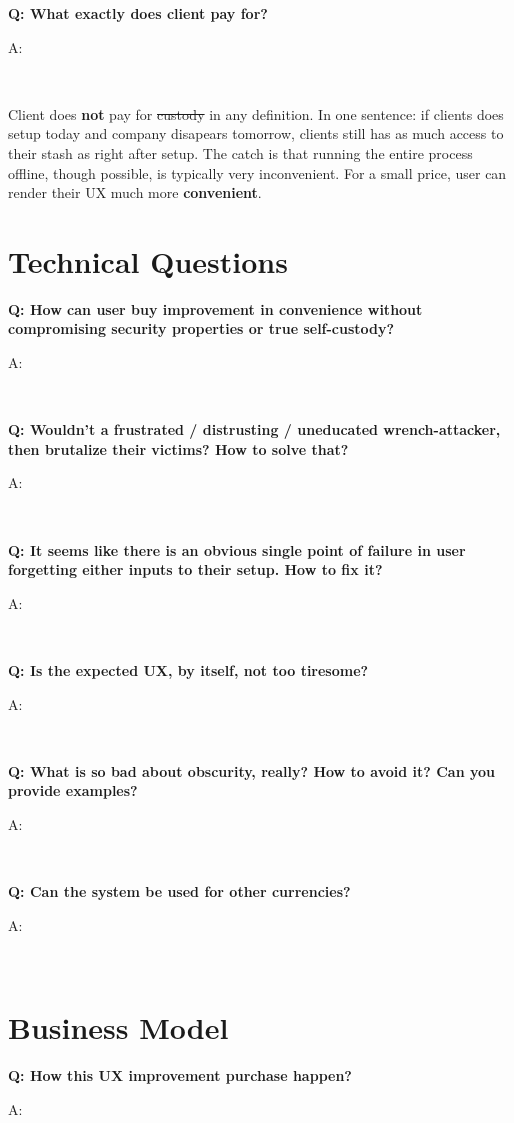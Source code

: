 \documentclass[12pt,a4paper]{article}
\newenvironment{question}[1]{%
  \vspace{0.8em}\noindent\textbf{Q: #1}\par
  \vspace{0.2em}\noindent\begin{itshape}A:\end{itshape}~%
}{\vspace{0.8em}}
\begin{document}
\begin{question}{What exactly does client pay for?}
Client does \textbf{not} pay for \sout{custody} in any definition. In one sentence: if clients does setup today and company disapears tomorrow, clients still has as much access to their stash as right after setup. The catch is that running the entire process offline, though possible, is typically very inconvenient. For a small price, user can render their UX much more \textbf{convenient}.
\end{question}

\section{Technical Questions}

\begin{question}{How can user buy improvement in convenience without compromising security properties or true self-custody?}
\end{question}

\begin{question}{Wouldn't a frustrated / distrusting / uneducated wrench-attacker, then brutalize their victims? How to solve that?}
\end{question}

\begin{question}{It seems like there is an obvious single point of failure in user forgetting either inputs to their setup. How to fix it?}
\end{question}

\begin{question}{Is the expected UX, by itself, not too tiresome?}
\end{question}

\begin{question}{What is so bad about obscurity, really? How to avoid it? Can you provide examples?}
\end{question}

\begin{question}{Can the system be used for other currencies?}
\end{question}

\section{Business Model}

\begin{question}{How this UX improvement purchase happen?}
\end{question}
\end{document}
